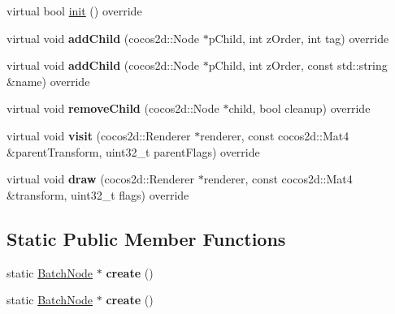 \begin{DoxyCompactItemize}
\item 
virtual bool \hyperlink{classcocostudio_1_1BatchNode_aa1d162d7257c613d8afd67a9282a2b79}{init} () override
\item 
\mbox{\label{classcocostudio_1_1BatchNode_acde859b3885c4981dbf40a2e157592f1}} 
virtual void {\bfseries add\+Child} (cocos2d\+::\+Node $\ast$p\+Child, int z\+Order, int tag) override
\item 
\mbox{\label{classcocostudio_1_1BatchNode_a949b54e89d55f023c2733e07d6e2bdb9}} 
virtual void {\bfseries add\+Child} (cocos2d\+::\+Node $\ast$p\+Child, int z\+Order, const std\+::string \&name) override
\item 
\mbox{\label{classcocostudio_1_1BatchNode_a033a2c0b1bae585e68791cb6781ec8e2}} 
virtual void {\bfseries remove\+Child} (cocos2d\+::\+Node $\ast$child, bool cleanup) override
\item 
\mbox{\label{classcocostudio_1_1BatchNode_ab3bc0c30cc80343b599569d02f768b65}} 
virtual void {\bfseries visit} (cocos2d\+::\+Renderer $\ast$renderer, const cocos2d\+::\+Mat4 \&parent\+Transform, uint32\+\_\+t parent\+Flags) override
\item 
\mbox{\label{classcocostudio_1_1BatchNode_a66acc5e2b0834bbcebf88acfcd187819}} 
virtual void {\bfseries draw} (cocos2d\+::\+Renderer $\ast$renderer, const cocos2d\+::\+Mat4 \&transform, uint32\+\_\+t flags) override
\end{DoxyCompactItemize}
\subsection*{Static Public Member Functions}
\begin{DoxyCompactItemize}
\item 
\mbox{\label{classcocostudio_1_1BatchNode_a1d6c72798918d0200ab2d47b74976a69}} 
static \hyperlink{classcocostudio_1_1BatchNode}{Batch\+Node} $\ast$ {\bfseries create} ()
\item 
\mbox{\label{classcocostudio_1_1BatchNode_a75e952bb2c399ba3ac54e75c579beac2}} 
static \hyperlink{classcocostudio_1_1BatchNode}{Batch\+Node} $\ast$ {\bfseries create} ()
\end{DoxyCompactItemize}
